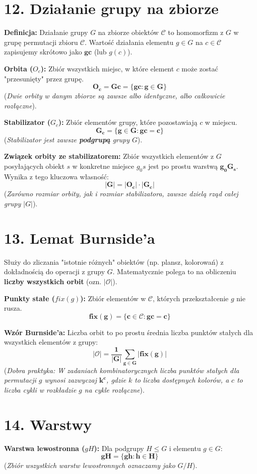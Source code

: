 \documentclass[12pt,a4paper]{article}
\begin{document}
\section*{12. Działanie grupy na zbiorze}
\noindent\textbf{Definicja:} Działanie grupy $G$ na zbiorze obiektów $\mathcal{C}$ to homomorfizm z $G$ w grupę permutacji zbioru $\mathcal{C}$. Wartość działania elementu $g \in G$ na $c \in \mathcal{C}$ zapisujemy skrótowo jako $\mathbf{gc}$ (lub $g(c)$). %

\noindent\textbf{Orbita ($O_c$):} Zbiór wszystkich miejsc, w które element $c$ może zostać "przesunięty" przez grupę. %
$$ \mathbf{O_c = Gc = \{gc : g \in G\}} $$ %
(\textit{Dwie orbity w danym zbiorze są zawsze albo identyczne, albo całkowicie rozłączne}). %

\noindent\textbf{Stabilizator ($G_c$):} Zbiór elementów grupy, które pozostawiają $c$ w miejscu. %
$$ \mathbf{G_c = \{g \in G : gc = c\}} $$ %
(\textit{Stabilizator jest zawsze \textbf{podgrupą} grupy $G$}). %

\noindent\textbf{Związek orbity ze stabilizatorem:} Zbiór wszystkich elementów z $G$ posyłających obiekt $s$ w konkretne miejsce $g_0s$ jest po prostu warstwą $\mathbf{g_0 G_s}$. Wynika z tego kluczowa własność: %
$$ \mathbf{|G| = |O_c| \cdot |G_c|} $$ %
(\textit{Zarówno rozmiar orbity, jak i rozmiar stabilizatora, zawsze dzielą rząd całej grupy $|G|$}). %

\section*{13. Lemat Burnside'a}
Służy do zliczania "istotnie różnych" obiektów (np. plansz, kolorowań) z dokładnością do operacji z grupy $G$. Matematycznie polega to na obliczeniu \textbf{liczby wszystkich orbit} (ozn. $|\mathcal{O}|$). %

\noindent\textbf{Punkty stałe ($fix(g)$):} Zbiór elementów w $\mathcal{C}$, których przekształcenie $g$ nie rusza. %
$$ \mathbf{fix(g) = \{c \in \mathcal{C} : gc = c\}} $$ %

\noindent\textbf{Wzór Burnside'a:} Liczba orbit to po prostu średnia liczba punktów stałych dla wszystkich elementów z grupy: %
$$ \mathbf{|\mathcal{O}| = \frac{1}{|G|} \sum_{g \in G} |fix(g)|} $$ %
(\textit{Dobra praktyka: W zadaniach kombinatorycznych liczba punktów stałych dla permutacji $g$ wynosi zazwyczaj $\mathbf{k^c}$, gdzie $k$ to liczba dostępnych kolorów, a $c$ to liczba cykli w rozkładzie $g$ na cykle rozłączne}). %

\section*{14. Warstwy}
\noindent\textbf{Warstwa lewostronna ($gH$):} Dla podgrupy $H \le G$ i elementu $g \in G$: %
$$ \mathbf{gH = \{gh : h \in H\}} $$ %
(\textit{Zbiór wszystkich warstw lewostronnych oznaczamy jako $G/H$}). %
\end{document}

